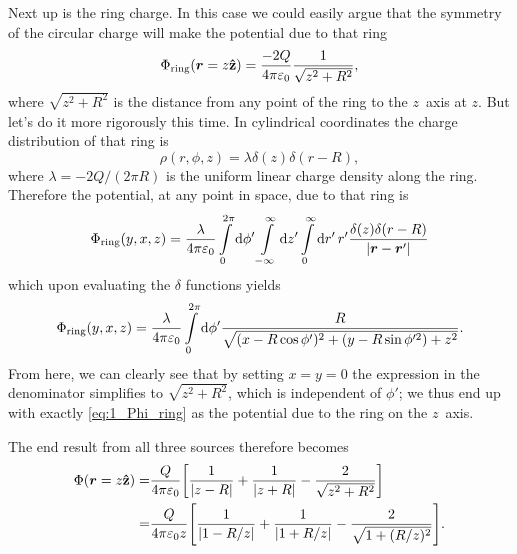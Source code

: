 \documentclass[11pt,letter, swedish, english
]{article}
\newcommand{\enaught}{\ensuremath\varepsilon_0}
\begin{document}
Next up is the ring charge. In this case we could easily argue that
the symmetry of the circular charge will make the potential due to
that ring 
\begin{equation}\label{eq:1_Phi_ring}
\Phi_\text{ring}(\vb*r=z\vu{z})=\frac{-2Q}{4\pi\enaught}
\frac{1}{\sqrt{z^2+R^2}},
\end{equation}
where $\sqrt{z^2+R^2}$ is the distance from any point of the ring to
the $z$~axis at $z$. But let's do it more rigorously this time. In
cylindrical coordinates the charge distribution of that ring is
\begin{equation}
\rho(r, \phi, z)=\lambda \delta(z)\delta(r-R),
\end{equation}
where $\lambda=-2Q/(2\pi R)$ is the uniform linear charge density
along the ring. 
Therefore the potential, at any point in space, due to that ring is
\begin{equation}
\Phi_\text{ring}(y, x, z)=\frac{\lambda}{4\pi\enaught}
\int_0^{2\pi}\rd\phi'\int_{-\infty}^\infty\rd{z'}\int_0^\infty\rd{r'}\,r'
\frac{\delta(z)\delta(r-R)}{\abs{\vb*r-\vb*r'}}
\end{equation}
which upon evaluating the $\delta$ functions yields
\begin{equation}
\Phi_\text{ring}(y, x, z)
= \frac{\lambda}{4\pi\enaught} \int_0^{2\pi}\rd\phi'
\frac{R}{\sqrt{(x-R\cos\phi')^2+(y-R\sin\phi'^2)+z^2}}.
\end{equation}
From here, we can clearly see that by setting $x=y=0$ the expression
in the denominator simplifies to $\sqrt{z^2+R^2}$, which is
independent of $\phi'$; we thus end up with exactly
\eqref{eq:1_Phi_ring} as the potential due to the ring on the
$z$~axis.  

The end result from all three sources therefore becomes
\begin{align}\label{eq:1_Phi_a}
\Phi(\vb*r=z\vu{z})=&\frac{Q}{4\pi\enaught}
\qty[\frac{1}{\abs{z-R}}+\frac{1}{\abs{z+R}}
-\frac{2}{\sqrt{z^2+R^2}}]
\\\label{eq:1_Phi_b}
=&\frac{Q}{4\pi\enaught z}
\qty[\frac{1}{\abs{1-R/z}}+\frac{1}{\abs{1+R/z}}
-\frac{2}{\sqrt{1+(R/z)^2}}].
\end{align}
\end{document}

